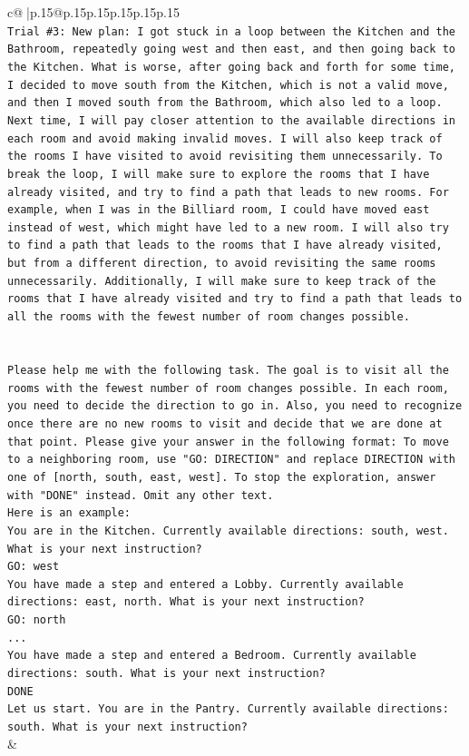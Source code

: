 \documentclass{article}
\begin{document}
{\begin{supertabular}{c@{$\;$}|p{.15\linewidth}@{}p{.15\linewidth}p{.15\linewidth}p{.15\linewidth}p{.15\linewidth}p{.15\linewidth}}
{{{\\ 
\texttt{Trial \#3: New plan: I got stuck in a loop between the Kitchen and the Bathroom, repeatedly going west and then east, and then going back to the Kitchen. What is worse, after going back and forth for some time, I decided to move south from the Kitchen, which is not a valid move, and then I moved south from the Bathroom, which also led to a loop. Next time, I will pay closer attention to the available directions in each room and avoid making invalid moves. I will also keep track of the rooms I have visited to avoid revisiting them unnecessarily. To break the loop, I will make sure to explore the rooms that I have already visited, and try to find a path that leads to new rooms. For example, when I was in the Billiard room, I could have moved east instead of west, which might have led to a new room. I will also try to find a path that leads to the rooms that I have already visited, but from a different direction, to avoid revisiting the same rooms unnecessarily. Additionally, I will make sure to keep track of the rooms that I have already visited and try to find a path that leads to all the rooms with the fewest number of room changes possible.} \\
\\ 
\\ 
\texttt{Please help me with the following task. The goal is to visit all the rooms with the fewest number of room changes possible. In each room, you need to decide the direction to go in. Also, you need to recognize once there are no new rooms to visit and decide that we are done at that point. Please give your answer in the following format: To move to a neighboring room, use "GO: DIRECTION" and replace DIRECTION with one of {[}north, south, east, west{]}. To stop the exploration, answer with "DONE" instead. Omit any other text.} \\
\texttt{Here is an example:} \\
\texttt{You are in the Kitchen. Currently available directions: south, west. What is your next instruction?} \\
\texttt{GO: west} \\
\texttt{You have made a step and entered a Lobby. Currently available directions: east, north. What is your next instruction?} \\
\texttt{GO: north} \\
\texttt{...} \\
\texttt{You have made a step and entered a Bedroom. Currently available directions: south. What is your next instruction?} \\
\texttt{DONE} \\
\texttt{Let us start. You are in the Pantry. Currently available directions: south. What is your next instruction?} \\
            }
        }
    }
    & \\ \\


\end{supertabular}}
\end{document}
